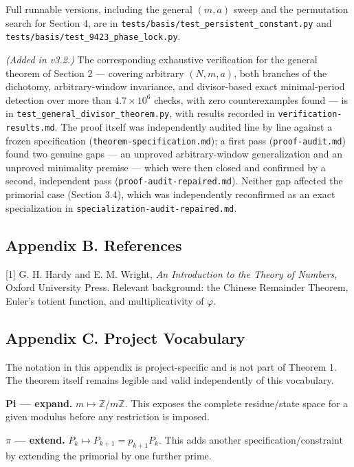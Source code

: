 \documentclass[
]{article}
\begin{document}
Full runnable versions, including the general \((m,a)\) sweep and the
permutation search for Section 4, are in
\texttt{tests/basis/test\_persistent\_constant.py} and
\texttt{tests/basis/test\_9423\_phase\_lock.py}.

\emph{(Added in v3.2.)} The corresponding exhaustive verification for
the general theorem of Section 2 --- covering arbitrary \((N,m,a)\),
both branches of the dichotomy, arbitrary-window invariance, and
divisor-based exact minimal-period detection over more than
\(4.7\times10^6\) checks, with zero counterexamples found --- is in
\texttt{test\_general\_divisor\_theorem.py}, with results recorded in
\texttt{verification-results.md}. The proof itself was independently
audited line by line against a frozen specification
(\texttt{theorem-specification.md}); a first pass
(\texttt{proof-audit.md}) found two genuine gaps --- an unproved
arbitrary-window generalization and an unproved minimality premise ---
which were then closed and confirmed by a second, independent pass
(\texttt{proof-audit-repaired.md}). Neither gap affected the primorial
case (Section 3.4), which was independently reconfirmed as an exact
specialization in \texttt{specialization-audit-repaired.md}.

\subsection{Appendix B. References}\label{appendix-b.-references}

{[}1{]} G. H. Hardy and E. M. Wright, \emph{An Introduction to the
Theory of Numbers}, Oxford University Press. Relevant background: the
Chinese Remainder Theorem, Euler's totient function, and
multiplicativity of \(\varphi\).

\subsection{Appendix C. Project
Vocabulary}\label{appendix-c.-project-vocabulary}

The notation in this appendix is project-specific and is not part of
Theorem 1. The theorem itself remains legible and valid independently of
this vocabulary.

\textbf{Pi --- expand.} \(m \mapsto \mathbb Z/m\mathbb Z\). This exposes
the complete residue/state space for a given modulus before any
restriction is imposed.

\textbf{\(\pi\) --- extend.} \(P_k \mapsto P_{k+1}=p_{k+1}P_k\). This
adds another specification/constraint by extending the primorial by one
further prime.
\end{document}
